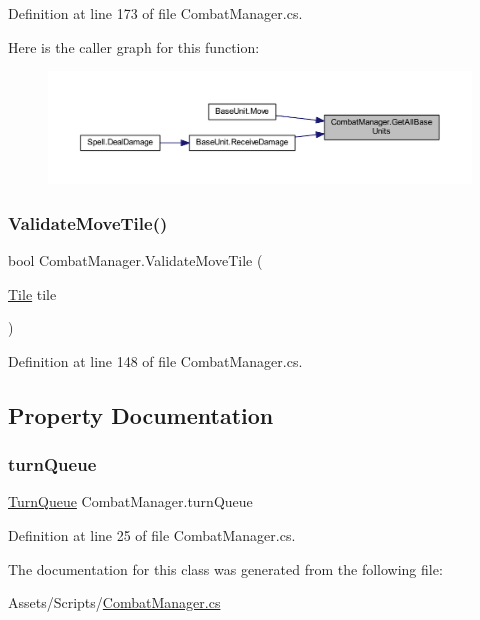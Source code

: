 Definition at line 173 of file Combat\+Manager.\+cs.

Here is the caller graph for this function\+:
\nopagebreak
\begin{figure}[H]
\begin{center}
\leavevmode
\includegraphics[width=350pt]{class_combat_manager_a02eb44e3f4fab4f210d4ecda54fa1272_icgraph}
\end{center}
\end{figure}
\mbox{\label{class_combat_manager_a6f648795292255b600e92eefcf960ded}} 
\subsubsection{\texorpdfstring{ValidateMoveTile()}{ValidateMoveTile()}}
{\footnotesize\ttfamily bool Combat\+Manager.\+Validate\+Move\+Tile (\begin{DoxyParamCaption}\item[{\mbox{\hyperlink{class_tile}{Tile}}}]{tile }\end{DoxyParamCaption})}



Definition at line 148 of file Combat\+Manager.\+cs.



\subsection{Property Documentation}
\mbox{\label{class_combat_manager_a6316ac49fbaf2e16426313d12749761d}} 
\subsubsection{\texorpdfstring{turnQueue}{turnQueue}}
{\footnotesize\ttfamily \mbox{\hyperlink{class_turn_queue}{Turn\+Queue}} Combat\+Manager.\+turn\+Queue\hspace{0.3cm}{\ttfamily [get]}}



Definition at line 25 of file Combat\+Manager.\+cs.



The documentation for this class was generated from the following file\+:\begin{DoxyCompactItemize}
\item 
Assets/\+Scripts/\mbox{\hyperlink{_combat_manager_8cs}{Combat\+Manager.\+cs}}\end{DoxyCompactItemize}
